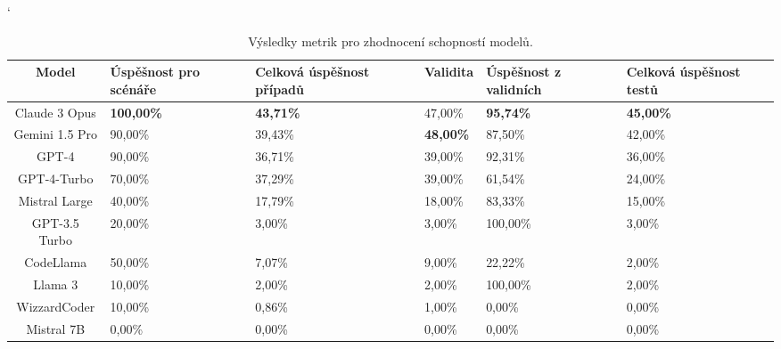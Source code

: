 \documentclass[czech, ma, kiv, he, iso690numb, pdf, viewonly]{fasthesis}
\begin{document}
        \begin{table}[H]
            \catcode`
            \begin{tabular}{|c|p{2cm}|p{2cm}|l|p{2cm}|p{2cm}|}
                \hline
                \textbf{Model} & \textbf{Úspěšnost pro \linebreak scénáře} & \textbf{Celková úspěšnost případů} & \textbf{Validita} & \textbf{Úspěšnost z validních} & \textbf{Celková úspěšnost testů} \\
                \hline
                \hline
                Claude 3 Opus & \textbf{100,00\%} & \textbf{43,71\%} & 47,00\% & \textbf{95,74\%} & \textbf{45,00\%} \\
                \hline
                Gemini 1.5 Pro & 90,00\% & 39,43\% & \textbf{48,00\%} & 87,50\% & 42,00\% \\
                \hline
                GPT-4         & 90,00\%  & 36,71\% & 39,00\% & 92,31\% & 36,00\% \\
                \hline
                GPT-4-Turbo   & 70,00\%  & 37,29\% & 39,00\% & 61,54\% & 24,00\% \\
                \hline
                Mistral Large & 40,00\%  & 17,79\% & 18,00\% & 83,33\% & 15,00\% \\
                \hline
                GPT-3.5 Turbo & 20,00\%  & 3,00\%  & 3,00\%  & 100,00\% & 3,00\% \\
                \hline
                CodeLlama     & 50,00\%  & 7,07\%  & 9,00\%  & 22,22\% & 2,00\% \\
                \hline
                Llama 3       & 10,00\%  & 2,00\%  & 2,00\%  & 100,00\% & 2,00\% \\
                \hline
                WizzardCoder  & 10,00\%  & 0,86\%  & 1,00\%  & 0,00\%  & 0,00\% \\
                \hline
                Mistral 7B    & 0,00\%   & 0,00\%  & 0,00\%  & 0,00\%  & 0,00\% \\
                \hline
            \end{tabular}
            \centering
            \caption{Výsledky metrik pro zhodnocení schopností modelů.}
            \label{tab:model_metrics}
        \end{table}
\end{document}
